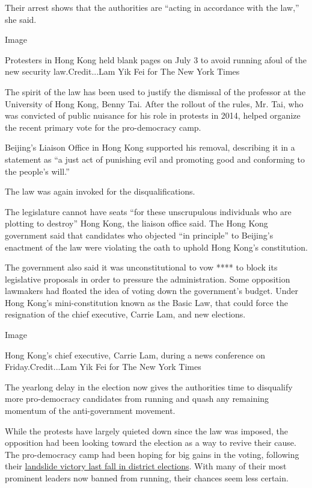 Their arrest shows that the authorities are ``acting in accordance with
the law,'' she said.

Image

Protesters in Hong Kong held blank pages on July 3 to avoid running
afoul of the new security law.Credit...Lam Yik Fei for The New York
Times

The spirit of the law has been used to justify the dismissal of the
professor at the University of Hong Kong, Benny Tai. After the rollout
of the rules, Mr. Tai, who was convicted of public nuisance for his role
in protests in 2014, helped organize the recent primary vote for the
pro-democracy camp.

Beijing's Liaison Office in Hong Kong supported his removal, describing
it in a statement as ``a just act of punishing evil and promoting good
and conforming to the people's will.''

The law was again invoked for the disqualifications.

The legislature cannot have seats ``for these unscrupulous individuals
who are plotting to destroy'' Hong Kong, the liaison office said. The
Hong Kong government said that candidates who objected ``in principle''
to Beijing's enactment of the law were violating the oath to uphold Hong
Kong's constitution.

The government also said it was unconstitutional to vow **** to block
its legislative proposals in order to pressure the administration. Some
opposition lawmakers had floated the idea of voting down the
government's budget. Under Hong Kong's mini-constitution known as the
Basic Law, that could force the resignation of the chief executive,
Carrie Lam, and new elections.

Image

Hong Kong's chief executive, Carrie Lam, during a news conference on
Friday.Credit...Lam Yik Fei for The New York Times

The yearlong delay in the election now gives the authorities time to
disqualify more pro-democracy candidates from running and quash any
remaining momentum of the anti-government movement.

While the protests have largely quieted down since the law was imposed,
the opposition had been looking toward the election as a way to revive
their cause. The pro-democracy camp had been hoping for big gains in the
voting, following their
\href{https://www.nytimes.com/2019/11/25/world/asia/hong-kong-election-protests.html}{landslide
victory last fall in district elections}. With many of their most
prominent leaders now banned from running, their chances seem less
certain.

